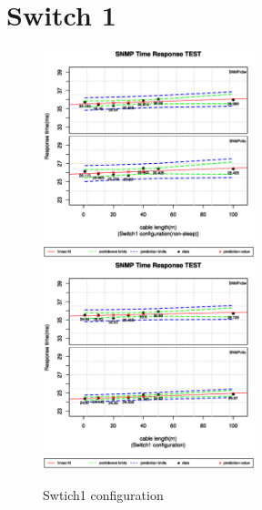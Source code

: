 \documentclass[11pt
  , a4paper
  , article
  , oneside
]{memoir}
\begin{document}
\section{Switch 1}
 \begin{figure}[!htb]
  \centering
  \includegraphics[width=0.55\textwidth]{./images/s1sx.eps}
  \includegraphics[width=0.55\textwidth]{./images/s1s1.eps}
  \caption{Swtich1 configuration}
\end{figure}
\clearpage
\end{document}
